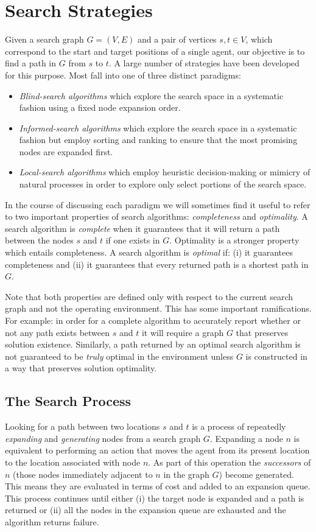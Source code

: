 \section{Search Strategies}
\label{cha::lit::search}
Given a search graph $G = (V, E)$ and a pair of vertices $s, t \in V$, which 
correspond to the start and target positions of a single agent, 
our objective is to find a path in $G$ from $s$ to $t$.
A large number of strategies have been developed for this purpose. Most fall into
one of three distinct paradigms:
\begin{itemize}
\item{\emph{Blind-search algorithms} which explore the search space in a systematic 
fashion using a fixed node expansion order.}
\item{\emph{Informed-search algorithms} which explore the search space in a systematic
fashion but employ sorting and ranking to ensure that the most promising nodes
are expanded first.}
\item{\emph{Local-search algorithms} which employ heuristic decision-making or mimicry of
natural processes in order to explore only select portions of the search space.}
\end{itemize}

In the course of discussing each paradigm we will sometimes find it useful to
refer to two important properties of search algorithms: \emph{completeness}
and \emph{optimality}.  A search algorithm is \emph{complete} when it
guarantees that it will return a path between the nodes $s$ and $t$ if one
exists in $G$.  Optimality is a stronger property which entails completeness.
A search algorithm is \emph{optimal} if: (i) it guarantees completeness and
(ii) it guarantees that every returned path is a shortest path in $G$.

Note that both properties are defined only with respect to the current search
graph and not the operating environment.  This has some important
ramifications. For example: in order for a complete algorithm to accurately
report whether or not any path exists between $s$ and $t$ it will require a
graph $G$ that preserves solution existence.  Similarly, a path returned by an
optimal search algorithm is not guaranteed to be \emph{truly} optimal in the
environment unless $G$ is constructed in a way that preserves solution
optimality.

\subsection{The Search Process}
\label{cha::lit::search:terms}
Looking for a path between two locations $s$ and $t$ is a process of
repeatedly \emph{expanding} and \emph{generating} nodes from a search graph
$G$.  Expanding a node $n$ is equivalent to performing an action that moves
the agent from its present location to the location associated with node $n$.
As part of this operation the \emph{successors} of $n$ (those nodes
immediately adjacent to $n$ in the graph $G$) become generated. This means
they are evaluated in terms of cost and added to an expansion queue.  This
process continues until either (i) the target node is expanded and a path is
returned or (ii) all the nodes in the expansion queue are exhausted and the
algorithm returns failure.

